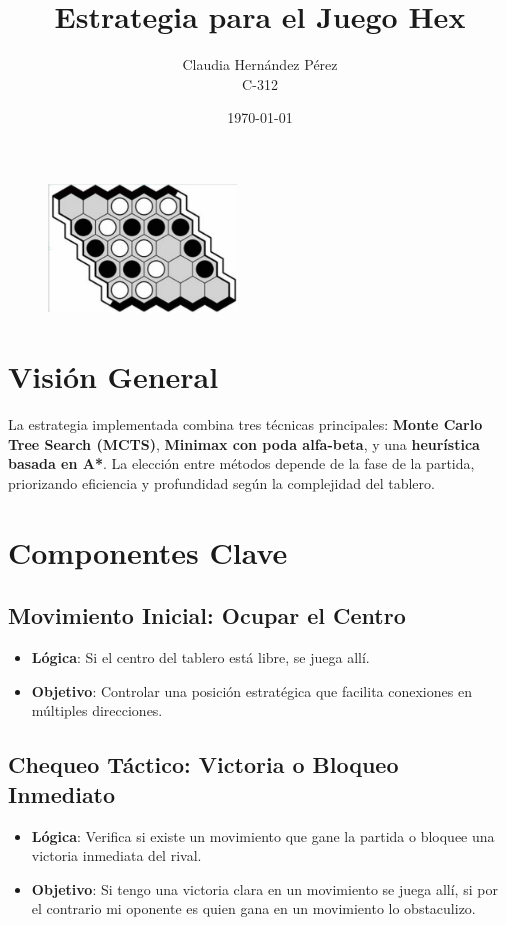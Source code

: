 \documentclass{article}
\title{Estrategia para el Juego Hex}
\author{Claudia Hernández Pérez \\ C-312}
\date{\today}
\begin{document}
\maketitle

\vspace{2cm}

\begin{figure}[h]
    \centering
    \includegraphics[width=5cm]{./images/hex_board.jpg}
\end{figure}

\newpage

\section{Visión General}
La estrategia implementada combina tres técnicas principales: \textbf{Monte Carlo Tree Search (MCTS)}, \textbf{Minimax con poda alfa-beta}, y una \textbf{heurística basada en A*}. La elección entre métodos depende de la fase de la partida, priorizando eficiencia y profundidad según la complejidad del tablero.

\section{Componentes Clave}

\subsection{Movimiento Inicial: Ocupar el Centro}
\begin{itemize}
\item \textbf{Lógica}: Si el centro del tablero está libre, se juega allí.
\item \textbf{Objetivo}: Controlar una posición estratégica que facilita conexiones en múltiples direcciones.
\end{itemize}

\subsection{Chequeo Táctico: Victoria o Bloqueo Inmediato}
\begin{itemize}
\item \textbf{Lógica}: Verifica si existe un movimiento que gane la partida o bloquee una victoria inmediata del rival.
\item \textbf{Objetivo}: Si tengo una victoria clara en un movimiento se juega allí, si por el contrario mi oponente es quien
    gana en un movimiento lo obstaculizo.
\end{itemize}
\end{document}
